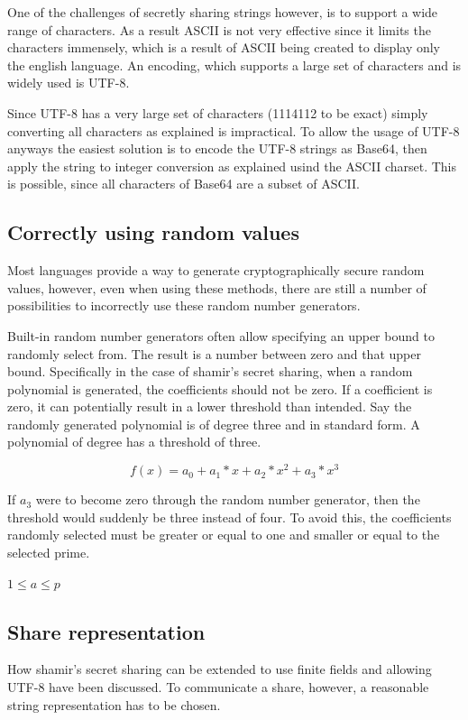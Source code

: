One of the challenges of secretly sharing strings however, is to support a wide
range of characters. As a result ASCII is not very effective since it limits
the characters immensely, which is a result of ASCII being created to display
only the english language. An encoding, which supports a large set of
characters and is widely used is UTF-8.

Since UTF-8 has a very large set of characters (1114112 to be exact) simply
converting all characters as explained is impractical. To allow the usage of
UTF-8 anyways the easiest solution is to encode the UTF-8 strings as Base64,
then apply the string to integer conversion as explained usind the ASCII
charset. This is possible, since all characters of Base64 are a subset of
ASCII.

\subsection{Correctly using random values}

Most languages provide a way to generate cryptographically secure random
values, however, even when using these methods, there are still a number of
possibilities to incorrectly use these random number generators.

Built-in random number generators often allow specifying an upper bound to
randomly select from. The result is a number between zero and that upper bound.
Specifically in the case of shamir's secret sharing, when a random polynomial
is generated, the coefficients should not be zero. If a coefficient is zero, it
can potentially result in a lower threshold than intended. Say the randomly
generated polynomial is of degree three and in standard form. A polynomial of
degree has a threshold of three.

$$f(x) = a_0 + a_1 * x + a_2 * x^2 + a_3 * x^3$$

If $a_3$ were to become zero through the random number generator, then the
threshold would suddenly be three instead of four. To avoid this, the
coefficients randomly selected must be greater or equal to one and smaller or
equal to the selected prime.

$1 \leq a \leq p$

\subsection{Share representation}

How shamir's secret sharing can be extended to use finite fields and allowing
UTF-8 have been discussed. To communicate a share, however, a reasonable string
representation has to be chosen.

